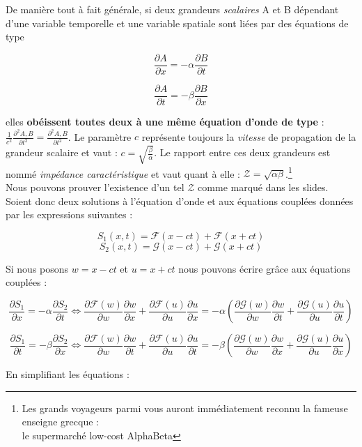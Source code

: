 \documentclass[a4paper,12pt]{article}
\begin{document}
De manière tout à fait générale, si deux grandeurs \textit{scalaires} A et B dépendant d'une variable temporelle et une variable spatiale sont 
liées par des équations de type 

\[\frac{\partial A}{\partial x} = -\alpha \frac{\partial B}{\partial t}\]

\[\frac{\partial A}{\partial t} = -\beta \frac{\partial B}{\partial x}\]

elles \textbf{obéissent toutes deux à une même équation d'onde de type} : $\frac{1}{c^{2}} \frac{\partial^{2} A,B}{\partial t^{2}} = \frac{\partial^{2} A,B}{\partial t^{2}}$. 
Le paramètre $c$ représente toujours la \textit{vitesse} de propagation de la grandeur scalaire et vaut : $c = \sqrt{\frac{\beta}{\alpha}}$. 
Le rapport entre ces deux grandeurs est nommé \textit{impédance caractéristique} et vaut quant à elle : $\mathcal{Z} = \sqrt{\alpha\beta}$.\footnote{Les grands voyageurs parmi vous auront immédiatement reconnu la fameuse enseigne grecque :\\ le supermarché low-cost AlphaBeta}\\ 

Nous pouvons prouver l'existence d'un tel $\mathcal{Z}$ comme marqué dans les slides. Soient donc deux solutions à l'équation d'onde et aux équations couplées données par les expressions suivantes :

\[S_{1}(x,t) = \mathcal{F}(x-ct) + \mathcal{F}(x+ct)\]
\[S_{2}(x,t) = \mathcal{G}(x-ct) + \mathcal{G}(x+ct)\]

Si nous posons $w = x-ct$ et $u = x+ct$ nous pouvons écrire grâce aux équations couplées : 

\[\frac{\partial S_{1}}{\partial x} = -\alpha \frac{\partial S_{2}}{\partial t} \Leftrightarrow \frac{\partial \mathcal{F}(w)}{\partial w}\frac{\partial w}{\partial x} + \frac{\partial \mathcal{F}(u)}{\partial u}\frac{\partial u}{\partial x} 
= -\alpha (\frac{\partial \mathcal{G}(w)}{\partial w}\frac{\partial w}{\partial t} + \frac{\partial \mathcal{G}(u)}{\partial u}\frac{\partial u}{\partial t})\]

\[\frac{\partial S_{1}}{\partial t} = -\beta \frac{\partial S_{2}}{\partial x} \Leftrightarrow \frac{\partial \mathcal{F}(w)}{\partial w}\frac{\partial w}{\partial t} + \frac{\partial \mathcal{F}(u)}{\partial u}\frac{\partial u}{\partial t} 
= -\beta (\frac{\partial \mathcal{G}(w)}{\partial w}\frac{\partial w}{\partial x} + \frac{\partial \mathcal{G}(u)}{\partial u}\frac{\partial u}{\partial x})\]

En simplifiant les équations : 
\end{document}
